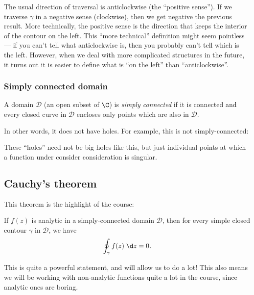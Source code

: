 \documentclass[a4paper]{article}
\begin{document}
The usual direction of traversal is anticlockwise (the ``positive sense''). If we traverse $\gamma$ in a negative sense (clockwise), then we get negative the previous result. More technically, the positive sense is the direction that keeps the interior of the contour on the left. This ``more technical'' definition might seem pointless --- if you can't tell what anticlockwise is, then you probably can't tell which is the left. However, when we deal with more complicated structures in the future, it turns out it is easier to define what is ``on the left'' than ``anticlockwise''.

\subsubsection*{Simply connected domain}
\begin{defi}
  A domain $\mathcal{D}$ (an open subset of $\C$) is \emph{simply connected} if it is connected and every closed curve in $\mathcal{D}$ encloses only points which are also in $\mathcal{D}$.
\end{defi}
In other words, it does not have holes. For example, this is not simply-connected:
\begin{center}
\end{center}
These ``holes'' need not be big holes like this, but just individual points at which a function under consider consideration is singular.

\subsection{Cauchy's theorem}
This theorem is the highlight of the course:
\begin{thm}
  If $f(z)$ is analytic in a simply-connected domain $\mathcal{D}$, then for every simple closed contour $\gamma$ in $\mathcal{D}$, we have
  \[
    \oint_\gamma f(z)\;\d z = 0.
  \]
\end{thm}
This is quite a powerful statement, and will allow us to do a lot! This also means we will be working with non-analytic functions quite a lot in the course, since analytic ones are boring.
\end{document}

